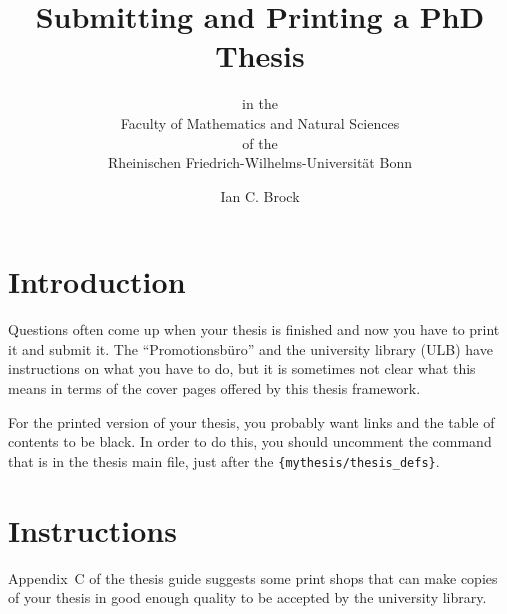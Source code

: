 \documentclass[a4paper,twoside,ngerman,british]{scrartcl}
\begin{document}
\title{Submitting and Printing a PhD Thesis}
\subtitle{\vspace*{4ex}
    in the\\
    Faculty of Mathematics and Natural Sciences\\
    of the\\
    Rheinischen Friedrich-Wilhelms-Universität Bonn
}
\author{Ian C. Brock}
\maketitle

\section{Introduction}
Questions often come up when your thesis is finished and now you have
to print it and submit it. The \foreignquote{ngerman}{Promotionsbüro}
and the university library (ULB) have instructions on what you have to
do, but it is sometimes not clear what this means in terms of the
cover pages offered by this thesis framework.

For the printed version of your thesis, you probably want
 links and the table of contents to be black. In
order to do this, you should uncomment the  command
that is in the thesis main file, just after the
\texttt{\{mythesis/thesis\_defs\}}.

\section{Instructions}


Appendix~C of the thesis guide suggests some print
shops that can make copies of your thesis in good enough quality to be
accepted by the university library.
\end{document}
